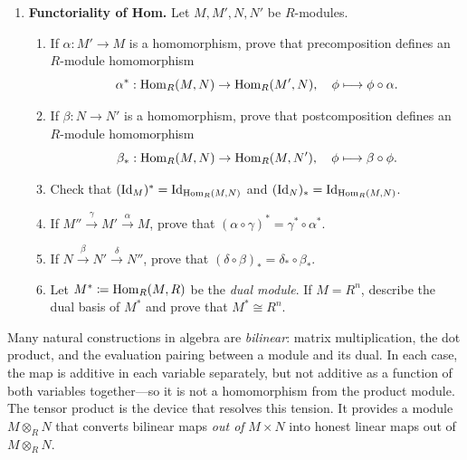 \documentclass[12pt,reqno]{amsart}
\begin{document}
\begin{enumerate}[leftmargin=*, resume=problems]
\item \textbf{Functoriality of Hom.} Let $M,M',N,N'$ be $R$-modules.
    \begin{enumerate}
    \item If $\alpha:M'\to M$ is a homomorphism, prove that precomposition defines an $R$-module homomorphism
    \[
    \alpha^*:\operatorname{Hom}_R(M,N)\to \operatorname{Hom}_R(M',N),
    \quad
    \phi\longmapsto \phi\circ \alpha.
    \]
    \item If $\beta:N\to N'$ is a homomorphism, prove that postcomposition defines an $R$-module homomorphism
    \[
    \beta_*:\operatorname{Hom}_R(M,N)\to \operatorname{Hom}_R(M,N'),
    \quad
    \phi\longmapsto \beta\circ \phi.
    \]
    \item Check that $(\operatorname{Id}_M)^*=\operatorname{Id}_{\operatorname{Hom}_R(M,N)}$ and $(\operatorname{Id}_N)_*=\operatorname{Id}_{\operatorname{Hom}_R(M,N)}$.
    \item If $M''\xrightarrow{\gamma}M'\xrightarrow{\alpha}M$, prove that $(\alpha\circ\gamma)^*=\gamma^*\circ \alpha^*$.
    \item If $N\xrightarrow{\beta}N'\xrightarrow{\delta}N''$, prove that $(\delta\circ\beta)_*=\delta_*\circ \beta_*$.
    \item Let $M^*\coloneqq \operatorname{Hom}_R(M,R)$ be the \emph{dual module}. If $M=R^n$, describe the dual basis of $M^*$ and prove that $M^*\cong R^n$.
    \end{enumerate}
\end{enumerate}

\hrulefill

Many natural constructions in algebra are \emph{bilinear}: matrix multiplication, the dot product, and the evaluation pairing between a module and its dual. In each case, the map is additive in each variable separately, but not additive as a function of both variables together---so it is not a homomorphism from the product module. The tensor product is the device that resolves this tension. It provides a module $M\otimes_R N$ that converts bilinear maps \emph{out of} $M\times N$ into honest linear maps out of $M\otimes_R N$.
 
\end{document}
